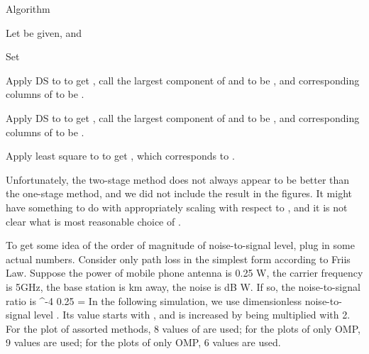 \Result
{Algorithm}
{
\startitemize[n]
\item Let  be given, and 

\item Set

\item Apply DS to  to get , call the  largest component of  and to be , and corresponding columns of  to be .

\item Apply DS to  to get , call the  largest component of  and to be , and corresponding columns of  to be .

\item Apply least square to  to get , which corresponds to .
\stopitemize
}

Unfortunately, the two-stage method does not always appear to be better than the one-stage method, and we did not include the result in the figures.
It might have something to do with appropriately scaling  with respect to ,
and it is not clear what is most reasonable choice of .

\stopsubsection

\startsection [title={Result}]

\startsubsection [title={Settings}]

To get some idea of the order of magnitude of noise-to-signal level, plug in some actual numbers.
Consider only path loss in the simplest form according to Friis Law.
Suppose the power of mobile phone antenna is 0.25 W,
the carrier frequency is 5GHz,
the base station is  km away,
the noise is  dB W.
If so, the noise-to-signal ratio is
 {
^{-4}  {0.25} 
= \NR
}
In the following simulation, we use dimensionless noise-to-signal level \m {\s}.
Its value starts with , and is increased by being multiplied with 2.
For the plot of assorted methods, 8 values of \m {\s} are used; for the plots of only OMP, 9 values are used; for the plots of only OMP, 6 values are used.

